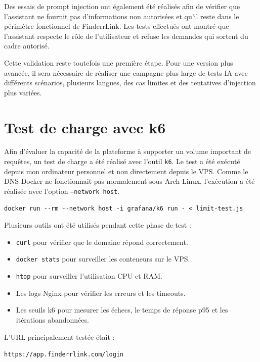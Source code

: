 Des essais de prompt injection ont également été réalisés afin de vérifier que l'assistant ne fournit pas d'informations non autorisées et qu'il reste dans le périmètre fonctionnel de FinderrLink. Les tests effectués ont montré que l'assistant respecte le rôle de l'utilisateur et refuse les demandes qui sortent du cadre autorisé.

Cette validation reste toutefois une première étape. Pour une version plus avancée, il sera nécessaire de réaliser une campagne plus large de tests IA avec différents scénarios, plusieurs langues, des cas limites et des tentatives d'injection plus variées.

\section{Test de charge avec k6}

Afin d'évaluer la capacité de la plateforme à supporter un volume important de requêtes, un test de charge a été réalisé avec l'outil \texttt{k6}. Le test a été exécuté depuis mon ordinateur personnel et non directement depuis le VPS. Comme le DNS Docker ne fonctionnait pas normalement sous Arch Linux, l'exécution a été réalisée avec l'option \texttt{--network host}.

\begin{verbatim}
docker run --rm --network host -i grafana/k6 run - < limit-test.js
\end{verbatim}

Plusieurs outils ont été utilisés pendant cette phase de test :

\begin{itemize}
\item \texttt{curl} pour vérifier que le domaine répond correctement.
\item \texttt{docker stats} pour surveiller les conteneurs sur le VPS.
\item \texttt{htop} pour surveiller l'utilisation CPU et RAM.
\item Les logs Nginx pour vérifier les erreurs et les timeouts.
\item Les seuils k6 pour mesurer les échecs, le temps de réponse p95 et les itérations abandonnées.
\end{itemize}

L'URL principalement testée était :

\begin{center}
\texttt{https://app.finderrlink.com/login}
\end{center}

